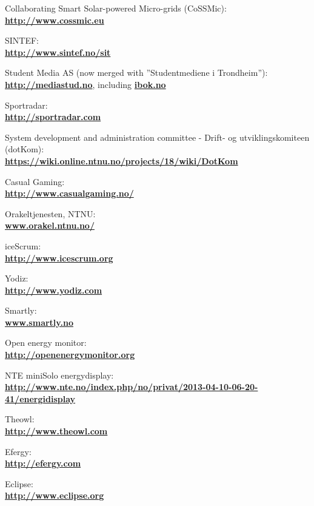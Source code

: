 \begin{thebibliography}{1}

 Collaborating Smart Solar-powered Micro-grids (CoSSMic):\\ \textbf{\url{http://www.cossmic.eu}}

 SINTEF: \\
\textbf{ \url{ http://www.sintef.no/sit}}

 Student Media AS (now merged with ''Studentmediene i Trondheim''):\\
\textbf{ \url{http://mediastud.no}}, including \textbf{ \url{ibok.no}}

 Sportradar:\\
\textbf{ \url{http://sportradar.com}}

 System development and administration committee - Drift- og utviklingskomiteen (dotKom):\\
\textbf{ \url{https://wiki.online.ntnu.no/projects/18/wiki/DotKom}}

 Casual Gaming:\\
\textbf{ \url{http://www.casualgaming.no/}}

 Orakeltjenesten, NTNU:\\
\textbf{ \url{www.orakel.ntnu.no/}}

 iceScrum: \\
\textbf{ \url{http://www.icescrum.org}}

 Yodiz: \\
\textbf{ \url{ http://www.yodiz.com}}
        
 Smartly: \\
\textbf{ \url{www.smartly.no}}

 Open energy monitor:\\
\textbf{ \url{http://openenergymonitor.org}}

 NTE miniSolo energydisplay:\\
\textbf{ \url{http://www.nte.no/index.php/no/privat/2013-04-10-06-20-41/energidisplay}}

 Theowl:\\
\textbf{ \url{http://www.theowl.com}}


 Efergy:\\
\textbf{ \url{http://efergy.com}}

 Eclipse:\\
\textbf{ \url{http://www.eclipse.org}}


\end{thebibliography}
